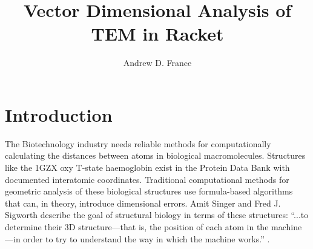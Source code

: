 \documentclass[man]{apa7}
\begin{document}
	\title{Vector Dimensional Analysis of TEM in Racket}
	\author{Andrew D. France}
	
	\maketitle
	
	\section{Introduction}
	The Biotechnology industry needs reliable methods for computationally calculating the distances between atoms in biological macromolecules.
	Structures like the 1GZX oxy T-state haemoglobin \parencite{1gzx} exist in the Protein Data Bank with documented interatomic coordinates. Traditional computational methods for geometric analysis of these biological structures use formula-based algorithms that can, in theory, introduce dimensional errors. Amit Singer and Fred J. Sigworth describe the goal of structural biology in terms of these structures: ``...to determine their 3D structure—that is, the position of each atom in the machine—in order to try to understand the way in which the machine works.'' \parencite{Singer2020}.
	
\end{document}
